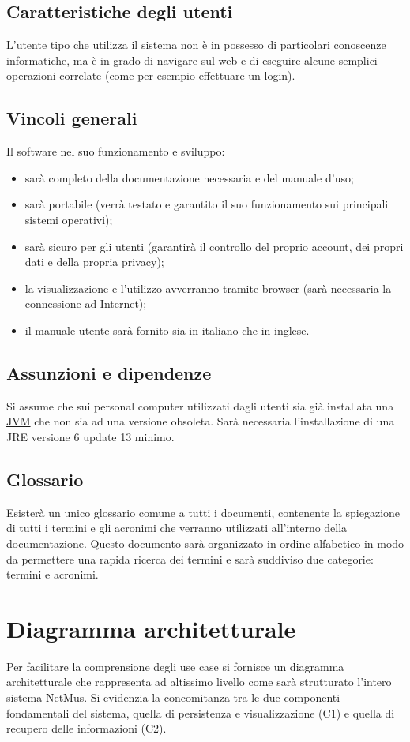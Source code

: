 \section{Caratteristiche degli utenti}
L'utente tipo che utilizza il sistema non \`e in possesso di particolari
conoscenze informatiche, ma \`e in grado di navigare sul web e di eseguire alcune
semplici operazioni correlate (come per esempio effettuare un login).

\section{Vincoli generali}
Il software nel suo funzionamento e sviluppo:
\begin{itemize}
  \item sar\`a completo della documentazione necessaria e del manuale d'uso;
  \item sar\`a portabile (verr\`a testato e garantito il suo funzionamento sui
  principali sistemi operativi);
  \item sar\`a sicuro per gli utenti (garantir\`a il controllo del proprio
  account, dei propri dati e della propria privacy);
  \item la visualizzazione e l'utilizzo avverranno tramite browser (sar\`a
  necessaria la connessione ad Internet);
  \item il manuale utente sar\`a fornito sia in italiano che in inglese.
\end{itemize}

\section{Assunzioni e dipendenze}
Si assume che sui personal computer utilizzati dagli utenti sia gi\`a installata
una \underline{JVM} che non sia ad una versione obsoleta. Sar\`a
necessaria l'installazione di una JRE  versione 6 update 13 minimo.

\section{Glossario}
Esister\`a un unico glossario comune a tutti i documenti, contenente la
spiegazione di tutti i termini e gli acronimi che verranno utilizzati
all'interno della documentazione. Questo documento sar\`a organizzato in ordine
alfabetico in modo da permettere una rapida ricerca dei termini e sar\`a suddiviso
due categorie: termini e acronimi.

\chapter{Diagramma architetturale}
\thispagestyle{fancy}
Per facilitare la comprensione degli use case si fornisce un diagramma
architetturale che rappresenta ad altissimo livello come sar\`a strutturato
l'intero sistema NetMus. Si evidenzia la concomitanza tra le due componenti fondamentali
del sistema, quella di persistenza e visualizzazione (C1) e quella di
recupero delle informazioni (C2).
\vspace{1cm}

